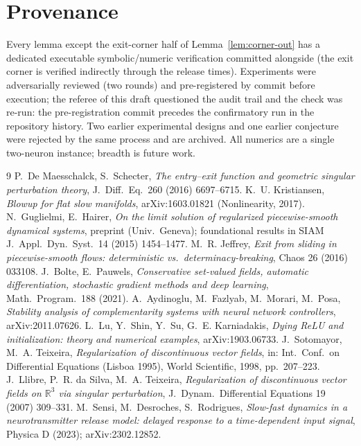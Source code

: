 \documentclass[11pt]{article}
\begin{document}
\section*{Provenance}
Every lemma except the exit-corner half of Lemma~\ref{lem:corner-out} has a
dedicated executable symbolic/numeric verification committed alongside (the
exit corner is verified indirectly through the release times). Experiments were
adversarially reviewed (two rounds) and pre-registered by commit before
execution; the referee of this draft questioned the audit trail and the check
was re-run: the pre-registration commit precedes the confirmatory run in the
repository history. Two earlier experimental designs and one earlier conjecture
were rejected by the same process and are archived. All numerics are a single
two-neuron instance; breadth is future work.

\begin{thebibliography}{9}
 P.~De Maesschalck, S.~Schecter, \emph{The entry--exit function
and geometric singular perturbation theory}, J.~Diff.~Eq.\ 260 (2016) 6697--6715.
 K.~U. Kristiansen, \emph{Blowup for flat slow manifolds},
arXiv:1603.01821 (Nonlinearity, 2017).
 N.~Guglielmi, E.~Hairer, \emph{On the limit solution of regularized
piecewise-smooth dynamical systems}, preprint (Univ.\ Geneva); foundational
results in SIAM J.~Appl.~Dyn.~Syst.\ 14 (2015) 1454--1477.
 M.~R. Jeffrey, \emph{Exit from sliding in piecewise-smooth
flows: deterministic vs.\ determinacy-breaking}, Chaos 26 (2016) 033108.
 J.~Bolte, E.~Pauwels, \emph{Conservative set-valued fields,
automatic differentiation, stochastic gradient methods and deep learning},
Math.~Program.\ 188 (2021).
 A.~Aydinoglu, M.~Fazlyab, M.~Morari, M.~Posa, \emph{Stability
analysis of complementarity systems with neural network controllers},
arXiv:2011.07626.
 L.~Lu, Y.~Shin, Y.~Su, G.~E. Karniadakis, \emph{Dying ReLU and
initialization: theory and numerical examples}, arXiv:1903.06733.
 J.~Sotomayor, M.~A. Teixeira, \emph{Regularization of
discontinuous vector fields}, in: Int.\ Conf.\ on Differential Equations
(Lisboa 1995), World Scientific, 1998, pp.~207--223.
 J.~Llibre, P.~R. da Silva, M.~A. Teixeira, \emph{Regularization
of discontinuous vector fields on $\mathbb{R}^3$ via singular perturbation},
J.~Dynam.~Differential Equations 19 (2007) 309--331.
 M.~Sensi, M.~Desroches, S.~Rodrigues, \emph{Slow-fast dynamics
in a neurotransmitter release model: delayed response to a time-dependent input
signal}, Physica D (2023); arXiv:2302.12852.
\end{thebibliography}
\end{document}
